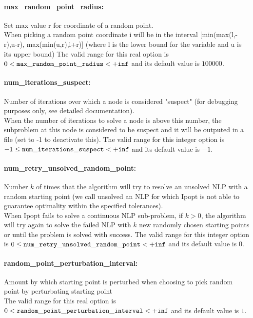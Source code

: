 \paragraph{max\_random\_point\_radius:}\label{sec:max_random_point_radius} Set max value r for coordinate of a random point. $\;$ \\
 When picking a random point coordinate i will be
in the interval [min(max(l,-r),u-r),
max(min(u,r),l+r)] (where l is the lower bound
for the variable and u is its upper bound) The valid range for this real option is 
$0 <  {\tt max\_random\_point\_radius } <  {\tt +inf}$
and its default value is $100000$.


\paragraph{num\_iterations\_suspect:}\label{sec:num_iterations_suspect} Number of iterations over which a node is considered "suspect" (for debugging purposes only, see detailed documentation). $\;$ \\
 When the number of iterations to solve a node is
above this number, the subproblem at this node is
considered to be suspect and it will be outputed
in a file (set to -1 to deactivate this). The valid range for this integer option is
$-1 \le {\tt num\_iterations\_suspect } <  {\tt +inf}$
and its default value is $-1$.


\paragraph{num\_retry\_unsolved\_random\_point:}\label{sec:num_retry_unsolved_random_point} Number $k$ of times that the algorithm will try to resolve an unsolved NLP with a random starting point (we call unsolved an NLP for which Ipopt is not able to guarantee optimality within the specified tolerances). $\;$ \\
 When Ipopt fails to solve a continuous NLP
sub-problem, if $k > 0$, the algorithm will try
again to solve the failed NLP with $k$ new
randomly chosen starting points  or until the
problem is solved with success. The valid range for this integer option is
$0 \le {\tt num\_retry\_unsolved\_random\_point } <  {\tt +inf}$
and its default value is $0$.


\paragraph{random\_point\_perturbation\_interval:}\label{sec:random_point_perturbation_interval} Amount by which starting point is perturbed when choosing to pick random point by perturbating starting point $\;$ \\
 The valid range for this real option is 
$0 <  {\tt random\_point\_perturbation\_interval } <  {\tt +inf}$
and its default value is $1$.


